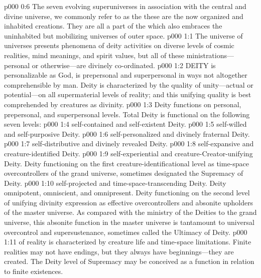 \vs p000 0:6 The seven evolving superuniverses in association with the central and divine universe, we commonly refer to as the  these are the now organized and inhabited creations. They are all a part of the  which also embraces the uninhabited but mobilizing universes of outer space.
\vs p000 1:1 The universe of universes presents phenomena of deity activities on diverse levels of cosmic realities, mind meanings, and spirit values, but all of these ministrations---personal or otherwise---are divinely co\hyp{}ordinated.
\pc \vs p000 1:2 DEITY is personalizable as God, is prepersonal and superpersonal in ways not altogether comprehensible by man. Deity is characterized by the quality of unity---actual or potential---on all supermaterial levels of reality; and this unifying quality is best comprehended by creatures as divinity.
\pc \vs p000 1:3 Deity functions on personal, prepersonal, and superpersonal levels. Total Deity is functional on the following seven levels:
\pc \vs p000 1:4 \bibnobreakspace {}self\hyp{}contained and self\hyp{}existent Deity.
\vs p000 1:5 \bibnobreakspace {}self\hyp{}willed and self\hyp{}purposive Deity.
\vs p000 1:6 \bibnobreakspace {}self\hyp{}personalized and divinely fraternal Deity.
\vs p000 1:7 \bibnobreakspace {}self\hyp{}distributive and divinely revealed Deity.
\vs p000 1:8 \bibnobreakspace {}self\hyp{}expansive and creature\hyp{}identified Deity.
\vs p000 1:9 \bibnobreakspace {}self\hyp{}experiential and creature\hyp{}Creator\hyp{}unifying Deity. Deity functioning on the first creature\hyp{}identificational level as time\hyp{}space overcontrollers of the grand universe, sometimes designated the Supremacy of Deity.
\vs p000 1:10 \bibnobreakspace {}self\hyp{}projected and time\hyp{}space\hyp{}transcending Deity. Deity omnipotent, omniscient, and omnipresent. Deity functioning on the second level of unifying divinity expression as effective overcontrollers and absonite upholders of the master universe. As compared with the ministry of the Deities to the grand universe, this absonite function in the master universe is tantamount to universal overcontrol and supersustenance, sometimes called the Ultimacy of Deity.
\pc \vs p000 1:11  of reality is characterized by creature life and time\hyp{}space limitations. Finite realities may not have endings, but they always have beginnings---they are created. The Deity level of Supremacy may be conceived as a function in relation to finite existences.

